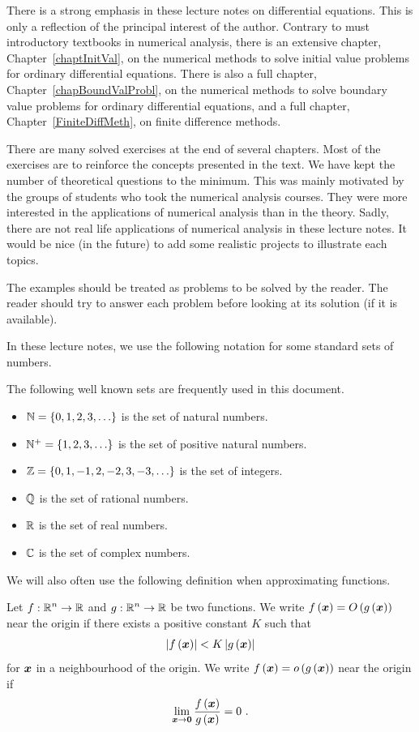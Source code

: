 There is a strong emphasis in these lecture notes on differential equations.
This is only a reflection of the principal interest of the author.
Contrary to must introductory textbooks in numerical analysis, 
there is an extensive chapter, Chapter~\ref{chaptInitVal}, on the
numerical methods to solve initial value problems for ordinary
differential equations.  There is also a full chapter,
Chapter~\ref{chapBoundValProbl}, on the numerical methods to solve
boundary value problems for ordinary differential equations, and 
a full chapter, Chapter~\ref{FiniteDiffMeth}, on finite difference
methods.

There are many solved exercises at the end of several chapters.  Most
of the exercises are to reinforce the concepts presented in the text.
We have kept the number of theoretical questions to the minimum.
This was mainly motivated by the groups of students who took the
numerical analysis courses.  They were more interested in the
applications of numerical analysis than in the theory.  Sadly, there
are not real life applications of numerical analysis in these lecture
notes.  It would be nice (in the future) to add some realistic
projects to illustrate each topics.

The examples should be treated as problems to be solved by the reader.
The reader should try to answer each problem before looking at its
solution (if it is available).

In these lecture notes, we use the following notation for some standard
sets of numbers.

\begin{defn*}
The following well known sets are frequently used in this document.
\begin{itemize}
\item $\mathbb{N} = \{0,1,2,3,\ldots \}$ is the set of natural numbers.
\item $\mathbb{N}^+ = \{1,2,3,\ldots \}$ is the set of positive natural numbers.
\item $\mathbb{Z} = \{0,1,-1,2,-2,3,-3, \ldots \}$ is the set of integers.
\item $\mathbb{Q}$ is the set of rational numbers.
\item $\mathbb{R}$ is the set of real numbers.
\item $\mathbb{C}$ is the set of complex numbers.
\end{itemize}
\end{defn*}

We will also often use the following definition when approximating
functions.

\begin{defn*} Let $\displaystyle f:\mathbb{R}^n \rightarrow \mathbb{R}$ and
$\displaystyle g:\mathbb{R}^n \rightarrow \mathbb{R}$ be two functions.  We write
$f\left(\bm{x}\right) = O\left(g\left(\bm{x}\right)\right)$ near
the origin if there exists a positive constant $K$ such that
\[
\left| f\left(\bm{x}\right) \right| < K \left| g\left(\bm{x}\right) \right|
\]
for $\bm{x}$ in a neighbourhood of the origin.  We write
$f\left(\bm{x}\right) = o\left(g\left(\bm{x}\right)\right)$ near
the origin if
\[
\lim_{\bm{x}\rightarrow \bm{0}} \frac{f\left(\bm{x}\right)}
{g\left(\bm{x}\right)} = 0 \ .
\]
\end{defn*}

